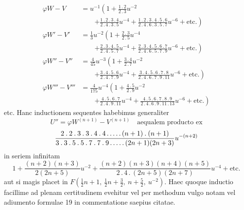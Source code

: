 \[
\begin{aligned}
\varphi W-V&=u^{-1}\left(1+\frac{1\mathbin{.}2}{2\mathbin{.}3}u^{-2}\right.\\[3pt]&\qquad\left.+\frac{1\mathbin{.}2\mathbin{.}3\mathbin{.}4}{2\mathbin{.}4\mathbin{.}3\mathbin{.}5}u^{-4}+\frac{1\mathbin{.}2\mathbin{.}3\mathbin{.}4\mathbin{.}5\mathbin{.}6}{2\mathbin{.}4\mathbin{.}6\mathbin{.}3\mathbin{.}5\mathbin{.}7}u^{-6}+\text{etc.}\right)\\[4pt]
\varphi W'-V'&=\tfrac13u^{-2}\left(1+\frac{2\mathbin{.}3}{2\mathbin{.}5}u^{-4}\right.\\[3pt]&\qquad\left.+\frac{2\mathbin{.}3\mathbin{.}4\mathbin{.}5}{2\mathbin{.}4\mathbin{.}5\mathbin{.}7}u^{-4}+\frac{2\mathbin{.}3\mathbin{.}4\mathbin{.}5\mathbin{.}6\mathbin{.}7}{2\mathbin{.}4\mathbin{.}6\mathbin{.}5\mathbin{.}7\mathbin{.}9}u^{-6}+\text{etc.}\right)\\[4pt]
\varphi W''-V''&=\tfrac4{45}u^{-3}\left(1+\frac{3\mathbin{.}4}{2\mathbin{.}7}u^{-2}\right.\\[3pt]&\qquad\left.+\frac{3\mathbin{.}4\mathbin{.}5\mathbin{.}6}{2\mathbin{.}4\mathbin{.}7\mathbin{.}9}u^{-4}+\frac{3\mathbin{.}4\mathbin{.}5\mathbin{.}6\mathbin{.}7\mathbin{.}8}{2\mathbin{.}4\mathbin{.}6\mathbin{.}7\mathbin{.}9\mathbin{.}11}u^{-6}+\text{etc.}\right)\\[4pt]
\varphi W'''-V'''&=\tfrac4{175}u^{-4}\left(1+\frac{4\mathbin{.}5}{2\mathbin{.}9}u^{-2}\right.\\[3pt]&\qquad\left.+\frac{4\mathbin{.}5\mathbin{.}6\mathbin{.}7}{2\mathbin{.}4\mathbin{.}9\mathbin{.}11}u^{-4}+\frac{4\mathbin{.}5\mathbin{.}6\mathbin{.}7\mathbin{.}8\mathbin{.}9}{2\mathbin{.}4\mathbin{.}6\mathbin{.}9\mathbin{.}11\mathbin{.}13}u^{-6}+\text{etc.}\right)
\end{aligned}
\]
etc. Hanc inductionem sequentes habebimus generaliter
\[
U''=\varphi W^{(n+1)}-V^{(n+1)}\quad\text{aequalem producto ex}
\]
\[
\frac{2\mathbin{.}2\mathbin{.}3\mathbin{.}3\mathbin{.}4\mathbin{.}4\mathinner{.\,.\,.\,.\,.}(n+1)\mathbin{.}(n+1)}{3\mathbin{.}3\mathbin{.}5\mathbin{.}5\mathbin{.}7\mathbin{.}7\mathbin{.}9\mathinner{.\,.\,.\,.\,.}(2n+1)(2n+3)}u^{-(n+2)}
\]
in seriem infinitam
\[
1+\frac{(n+2)(n+3)}{2(2n+5)}u^{-2}+\frac{(n+2)(n+3)(n+4)(n+5)}{2\mathbin{.}4\mathbin{.}(2n+5)(2n+7)}u^{-4}+\text{etc.}
\]
aut si magis placet in $F(\frac12n+1,\ \frac12n+\frac32,\ n+\frac52,\ u^{-2})$. Haec quoque inductio
facillime ad plenam certitudinem evehitur vel per methodum vulgo notam vel adiumento formulae 19 in commentatione saepius citatae.

